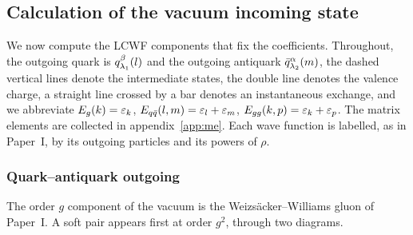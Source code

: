\subsection{Calculation of the vacuum incoming state}
\label{sec:wf-vac}

We now compute the LCWF components that fix the coefficients. Throughout, the outgoing quark is
$q^{\beta}_{\lambda_{1}}(l)$ and the outgoing antiquark $\bar q^{\alpha}_{\lambda_{2}}(m)$, the dashed
vertical lines denote the intermediate states, the double line denotes the valence charge, a
straight line crossed by a bar denotes an instantaneous exchange, and we abbreviate
$E_{g}(k)=\varepsilon_{k}$, $E_{q\bar q}(l,m)=\varepsilon_{l}+\varepsilon_{m}$, $E_{gg}(k,p)=\varepsilon_{k}+\varepsilon_{p}$. The
matrix elements are collected in appendix~\ref{app:me}. Each wave function is labelled, as in
Paper~I, by its outgoing particles and its powers of $\rho$.

\subsubsection{Quark--antiquark outgoing}

The order $g$ component of the vacuum is the Weizs\"acker--Williams gluon of Paper~I. A soft pair
appears first at order $g^{2}$, through two diagrams.


